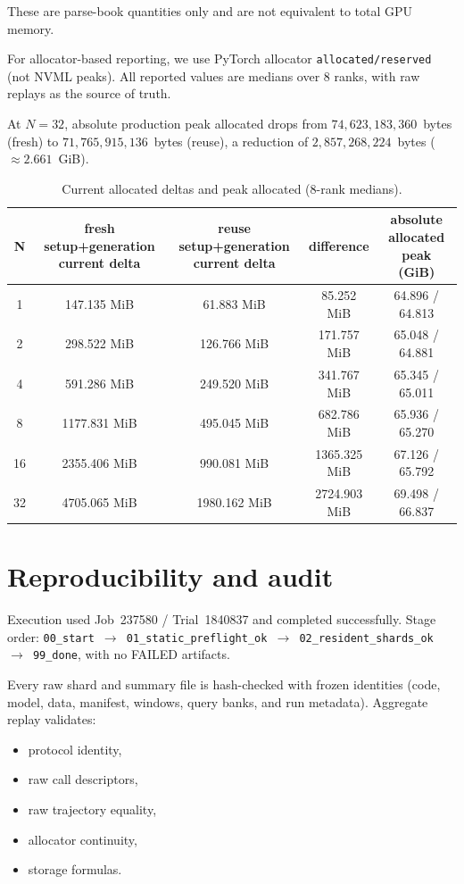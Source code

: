 \documentclass{article}
\begin{document}
These are parse-book quantities only and are not equivalent to total GPU memory.

For allocator-based reporting, we use PyTorch allocator \texttt{allocated/reserved} (not NVML peaks). All reported values are medians over 8 ranks, with raw replays as the source of truth.

At $N=32$, absolute production peak allocated drops from
$74{,}623{,}183{,}360$~bytes (fresh) to
$71{,}765{,}915{,}136$~bytes (reuse), a reduction of
$2{,}857{,}268{,}224$~bytes ($\approx 2.661$~GiB).

\begin{table}[h]
\centering
\begin{tabular}{ccccc}
\toprule
N & fresh setup+generation current delta & reuse setup+generation current delta & difference & absolute allocated peak (GiB)\\
\midrule
1 & 147.135 MiB & 61.883 MiB & 85.252 MiB & 64.896 / 64.813\\
2 & 298.522 MiB & 126.766 MiB & 171.757 MiB & 65.048 / 64.881\\
4 & 591.286 MiB & 249.520 MiB & 341.767 MiB & 65.345 / 65.011\\
8 & 1177.831 MiB & 495.045 MiB & 682.786 MiB & 65.936 / 65.270\\
16 & 2355.406 MiB & 990.081 MiB & 1365.325 MiB & 67.126 / 65.792\\
32 & 4705.065 MiB & 1980.162 MiB & 2724.903 MiB & 69.498 / 66.837\\
\bottomrule
\end{tabular}
\caption{Current allocated deltas and peak allocated (8-rank medians).}
\end{table}

\section{Reproducibility and audit}
Execution used Job~237580 / Trial~1840837 and completed successfully.
Stage order:
\texttt{00\_start $\rightarrow$ 01\_static\_preflight\_ok $\rightarrow$ 02\_resident\_shards\_ok $\rightarrow$ 99\_done},
with no FAILED artifacts.

Every raw shard and summary file is hash-checked with frozen identities (code, model, data, manifest, windows, query banks, and run metadata). Aggregate replay validates:
\begin{itemize}
  \item protocol identity,
  \item raw call descriptors,
  \item raw trajectory equality,
  \item allocator continuity,
  \item storage formulas.
\end{itemize}
\end{document}
